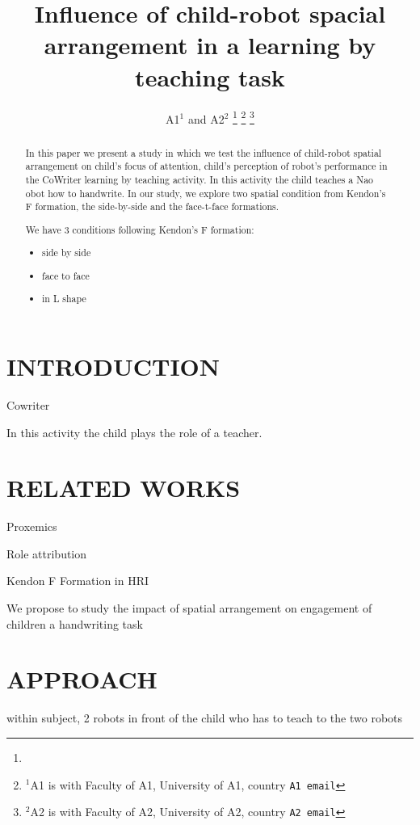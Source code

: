 \documentclass[letterpaper, 10 pt, conference]{ieeeconf}  %
\title{\LARGE \bf
Influence of child-robot spacial arrangement in a learning by teaching task}
\author{A1$^{1}$ and A2$^{2}$%
\thanks{}%
\thanks{$^{1}$A1 is with Faculty of A1,
        University of A1, country
        {\tt\small A1 email}}%
\thanks{$^{2}$A2 is with Faculty of A2,
        University of A2, country
        {\tt\small A2 email}}%
}
\begin{document}
\maketitle
\thispagestyle{empty}
\pagestyle{empty}


\begin{abstract}
In this paper we present a study in which we test the influence of child-robot spatial arrangement on child's focus of attention, child's perception of robot's performance in the CoWriter learning by teaching activity.
In this activity the child teaches a Nao obot how to handwrite. 
In our study, we explore two spatial condition from Kendon's F formation, the side-by-side and the face-t-face formations. 

We have 3 conditions following Kendon's F formation: 
\begin{itemize}
\item side by side
\item face to face
\item in L shape
\end{itemize}



\end{abstract}


\section{INTRODUCTION}
Cowriter

In this activity the child plays the role of a teacher. 



\section{RELATED WORKS}
Proxemics

Role attribution

Kendon F Formation in HRI
\cite{huttenrauch2006investigating}

We propose to study the impact of spatial arrangement on engagement of children a handwriting task
\section{APPROACH}

within subject, 2 robots in front of the child who has to teach to the two robots
\end{document}
